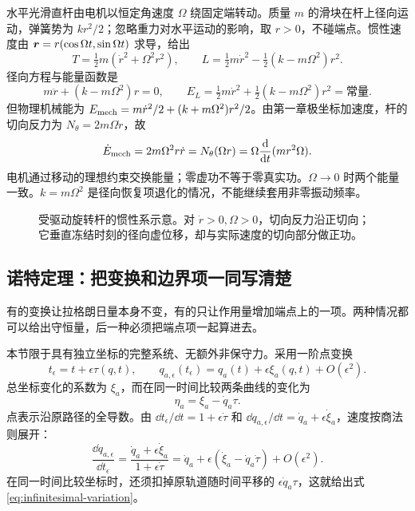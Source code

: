 \begin{example}
水平光滑直杆由电机以恒定角速度 $\Omega$ 绕固定端转动。质量 $m$ 的滑块在杆上径向运动，弹簧势为 $kr^2/2$；忽略重力对水平运动的影响，取 $r>0$，不碰端点。惯性速度由 $\boldsymbol{r}=r(\cos\Omega t,\sin\Omega t)$ 求导，给出
\[
T=\tfrac12m(\dot r^2+\Omega^2r^2),\qquad
L=\tfrac12m\dot r^2-\tfrac12(k-m\Omega^2)r^2.
\]
径向方程与能量函数是
\[
m\ddot r+(k-m\Omega^2)r=0,\qquad
E_L=\tfrac12m\dot r^2+\tfrac12(k-m\Omega^2)r^2=\text{常量}.
\]
但物理机械能为 $E_{\rm mech}=m\dot r^2/2+(k+m\Omega^2)r^2/2$。由第一章极坐标加速度，杆的切向反力为 $N_\theta=2m\Omega\dot r$，故
\[
\dot E_{\rm mech}=2m\Omega^2r\dot r
=N_\theta(\Omega r)=\Omega\frac{\mathrm{d}}{\mathrm{d} t}(mr^2\Omega).
\]
电机通过移动的理想约束交换能量；零虚功不等于零真实功。$\Omega\to0$ 时两个能量一致。$k=m\Omega^2$ 是径向恢复项退化的情况，不能继续套用非零振动频率。
\end{example}
\begin{figure}[htbp]
\centering
{}
\caption{受驱动旋转杆的惯性系示意。对 $\dot r>0,\Omega>0$，切向反力沿正切向；它垂直冻结时刻的径向虚位移，却与实际速度的切向部分做正功。}
\label{fig:lag-driven-rod}
\end{figure}

\subsection{诺特定理：把变换和边界项一同写清楚}
有的变换让拉格朗日量本身不变，有的只让作用量增加端点上的一项。两种情况都可以给出守恒量，后一种必须把端点项一起算进去。

本节限于具有独立坐标的完整系统、无额外非保守力。采用一阶点变换
\begin{equation}\label{eq:one-parameter-transform}
t_\epsilon=t+\epsilon\tau(q,t),\qquad
q_{a,\epsilon}(t_\epsilon)=q_a(t)+\epsilon\xi_a(q,t)+O(\epsilon^2).
\end{equation}
总坐标变化的系数为 $\xi_a$，而在同一时间比较两条曲线的变化为
\begin{equation}\label{eq:infinitesimal-variation}
\eta_a=\xi_a-\dot q_a\tau.
\end{equation}
点表示沿原路径的全导数。由 $\dd t_\epsilon/\dd t=1+\epsilon\dot\tau$ 和 $\dd q_{a,\epsilon}/\dd t=\dot q_a+\epsilon\dot\xi_a$，速度按商法则展开：
\[
\frac{\dd q_{a,\epsilon}}{\dd t_\epsilon}
=\frac{\dot q_a+\epsilon\dot\xi_a}{1+\epsilon\dot\tau}
=\dot q_a+\epsilon(\dot\xi_a-\dot q_a\dot\tau)+O(\epsilon^2).
\]
在同一时间比较坐标时，还须扣掉原轨道随时间平移的 $\epsilon\dot q_a\tau$，这就给出式 \eqref{eq:infinitesimal-variation}。

